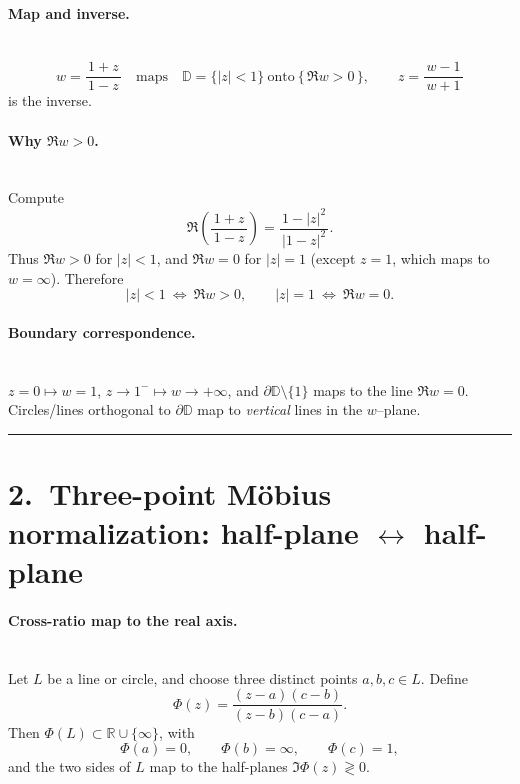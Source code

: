 \documentclass[11pt]{article}
\begin{document}
\paragraph{Map and inverse.}\mbox{}\\[2pt]
\[
w=\frac{1+z}{\,1-z\,}
\quad\text{maps}\quad
\mathbb D=\{|z|<1\}\ \text{onto}\ \{\,\Re w>0\,\},
\qquad
z=\frac{w-1}{\,w+1\,}
\]
is the inverse.

\medskip

\paragraph{Why $\Re w>0$.}\mbox{}\\[2pt]
Compute
\[
\Re\!\left(\frac{1+z}{\,1-z\,}\right)
=\frac{\,1-|z|^{2}\,}{\,|1-z|^{2}\,}.
\]
Thus $\Re w>0$ for $|z|<1$, and $\Re w=0$ for $|z|=1$ (except $z=1$, which maps to $w=\infty$).
Therefore
\[
|z|<1\ \Longleftrightarrow\ \Re w>0,
\qquad
|z|=1\ \Longleftrightarrow\ \Re w=0 .
\]

\medskip

\paragraph{Boundary correspondence.}\mbox{}\\[2pt]
$z=0\mapsto w=1$,
\quad
$z\to1^{-}\mapsto w\to+\infty$,
\quad
and $\partial\mathbb D\setminus\{1\}$ maps to the line $\Re w=0$.\\[2pt]
Circles/lines orthogonal to $\partial\mathbb D$ map to \emph{vertical} lines in the $w$–plane.

\bigskip\hrule\bigskip

\section*{2.\ Three-point Möbius normalization: half-plane $\leftrightarrow$ half-plane}

\paragraph{Cross-ratio map to the real axis.}\mbox{}\\[2pt]
Let $L$ be a line or circle, and choose three distinct points $a,b,c\in L$. Define
\[
\Phi(z)=\frac{(z-a)(c-b)}{(z-b)(c-a)}.
\]
Then $\Phi(L)\subset\mathbb R\cup\{\infty\}$, with
\[
\Phi(a)=0,\qquad \Phi(b)=\infty,\qquad \Phi(c)=1,
\]
and the two sides of $L$ map to the half-planes $\Im\Phi(z)\gtrless 0$.
\end{document}
